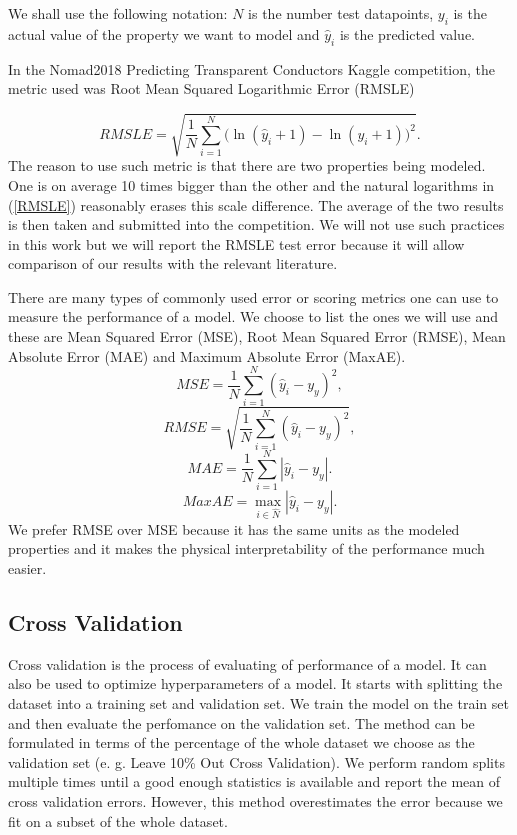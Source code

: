 \documentclass[11pt,oneside,czech,american]{book} %
\theoremstyle{plain}
\theoremstyle{definition}
\begin{document}
We shall use the following notation: $N$ is the number test datapoints, $y_i$ is the actual value of the property we want to model and $\hat{y}_i$ is the predicted value.

In the Nomad2018 Predicting Transparent Conductors Kaggle competition, the metric used was Root Mean Squared Logarithmic Error (RMSLE) \parencite{sutton19}

\begin{equation}
	RMSLE = \sqrt{\frac{1}{N} \sum_{i=1}^{N} \Big(\ln(\hat{y}_i+ 1) - \ln(y_i+ 1)\Big)^2}.
	\label{RMSLE}
\end{equation}
The reason to use such metric is that there are two properties being modeled. One is on average 10 times bigger than the other and the natural logarithms in (\ref{RMSLE}) reasonably erases this scale difference. The average of the two results is then taken and submitted into the competition. We will not use such practices in this work but we will report the RMSLE test error because it will allow comparison of our results with the relevant literature.

There are many types of commonly used error or scoring metrics one can use to measure the performance of a model. We choose to list the ones we will use and these are Mean Squared Error (MSE), Root Mean Squared Error (RMSE), Mean Absolute Error (MAE) and Maximum Absolute Error (MaxAE).
\begin{equation}
	MSE = \frac{1}{N} \sum_{i=1}^{N}(\hat{y}_i - y_y)^2,
\end{equation}
\begin{equation}
	RMSE = \sqrt{\frac{1}{N} \sum_{i=1}^{N}(\hat{y}_i - y_y)^2},
\end{equation}
\begin{equation}
	MAE = \frac{1}{N} \sum_{i=1}^{N}|\hat{y}_i - y_y|.
\end{equation}
\begin{equation}
	MaxAE = \max_{i \in \hat{N}}|\hat{y}_i - y_y|.
\end{equation}
We prefer RMSE over MSE because it has the same units as the modeled properties and it makes the physical interpretability of the performance much easier.
\subsection{Cross Validation}
Cross validation is the process of evaluating of performance of a model. It can also be used to optimize hyperparameters of a model. It starts with splitting the dataset into a training set and validation set. We train the model on the train set and then evaluate the perfomance on the validation set. The method can be formulated in terms of the percentage of the whole dataset we choose as the validation set (e. g. Leave 10\% Out Cross Validation). We perform random splits multiple times until a good enough statistics is available and report the mean of cross validation errors. However, this method overestimates the error because we fit on a subset of the whole dataset.
\end{document}
